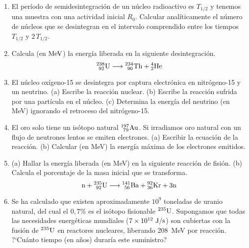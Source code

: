 \documentclass[11pt]{articulo}
\begin{document}
\begin{enumerate}
\item El per\'iodo de semidesintegraci\'on de un n\'ucleo radioactivo es $T_{1/2}$ y tenemos una muestra con una actividad inicial $R_0$. Calcular anal\'iticamente el n\'umero de n\'ucleos que se desintegran en el intervalo comprendido entre los tiempos $T_{1/2}$ y $2 \,T_{1/2}$.

\item Calcula (en ${\rm MeV}$) la energ\'ia liberada en la siguiente desintegraci\'on.
%
\begin{equation*}
{\rm {_{~92}^{238}U} \longrightarrow {_{~90}^{234}Th} + {_2^4He}}
\end{equation*}

\item El n\'ucleo ox\'igeno-15 se desintegra por captura electr\'onica en nitr\'ogeno-15 y un neutrino. (a) Escribe la reacci\'on nuclear. (b) Escribe la reacci\'on sufrida por una part\'icula en el n\'ucleo. (c) Determina la energ\'ia del neutrino (en MeV) ignorando el retroceso del nitr\'ogeno-15. 

\item El oro solo tiene un is\'otopo natural $_{~79}^{197}{\rm Au}$. Si irradiamos oro natural con un flujo de neutrones lentos se emiten electrones. (a) Escribir la ecuaci\'on de la reacci\'on. (b) Calcular (en MeV) la energ\'ia m\'axima de los electrones emitidos.

\item (a) Hallar la energ\'ia liberada (en MeV) en la siguiente reacci\'on de fisi\'on. (b) Calcula el porcentaje de la masa inicial que se transforma.
%
\begin{equation*}
{\rm n + {_{~92}^{235}U} \longrightarrow {_{~56}^{141}Ba} + {_{36}^{92}Kr} + 3n}
\end{equation*}

\item Se ha calculado que existen aproximadamente $10^9$ toneladas de uranio natural, del cual el $0,7\%$ es el is\'otopo fisionable $^{235}{\rm U}$. Supongamos que todas las necesidades energ\'eticas mundiales ($7 \times 10^{12}~{\rm J/s}$) son cubiertas con la fusi\'on de $^{235}{\rm U}$ en reactores nucleares, liberando 208~MeV por reacci\'on. ?`Cu\'anto tiempo (en a\~nos) durar\'ia este suministro?

\end{enumerate}


\vspace*{0.25cm}
\end{document}
